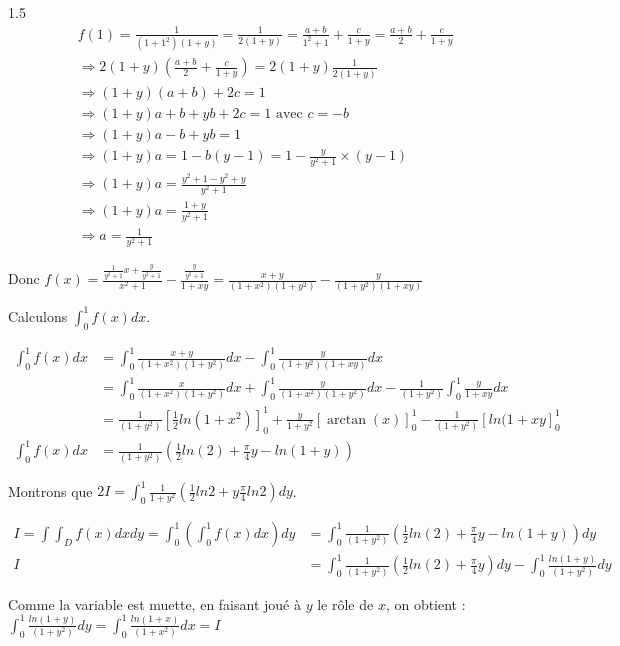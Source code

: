 \documentclass[12pt]{article}
\begin{document}
\begin{spacing}{1.5}
\begin{align*}
&f(1)=\frac{1}{(1+1^2)(1+y)}=\frac{1}{2(1+y)}=\frac{a+b}{1^2+1}+\frac{c}{1+y}=\frac{a+b}{2}+\frac{c}{1+y}\\
&\Rightarrow 2(1+y)(\frac{a+b}{2}+\frac{c}{1+y})=2(1+y)\frac{1}{2(1+y)}\\
&\Rightarrow (1+y)(a+b)+2c=1\\
&\Rightarrow (1+y)a+b+yb+2c=1 \text{ avec } c=-b\\
&\Rightarrow (1+y)a-b+yb=1\\
&\Rightarrow (1+y)a=1-b(y-1)=1-\frac{y}{y^2+1}\times(y-1)\\
&\Rightarrow (1+y)a=\frac{y^2+1-y^2+y}{y^2+1}\\
&\Rightarrow (1+y)a=\frac{1+y}{y^2+1}\\
&\Rightarrow a=\frac{1}{y^2+1}
\end{align*}

Donc $f(x)=\frac{\frac{1}{y^2+1}x+\frac{y}{y^2+1}}{x^2+1}-\frac{\frac{y}{y^2+1}}{1+xy}=\frac{x+y}{(1+x^2)(1+y^2)}-\frac{y}{(1+y^2)(1+xy)}$

Calculons $\int_{0}^{1}f(x)dx$.

\begin{align*}
\int_{0}^{1}f(x)dx &=\int_{0}^{1}\frac{x+y}{(1+x^2)(1+y^2)}dx-\int_{0}^{1}\frac{y}{(1+y^2)(1+xy)}dx\\
&=\int_{0}^{1}\frac{x}{(1+x^2)(1+y^2)}dx+\int_{0}^{1}\frac{y}{(1+x^2)(1+y^2)}dx-\frac{1}{(1+y^2)}\int_{0}^{1}\frac{y}{1+xy}dx\\
&=\frac{1}{(1+y^2)}[\frac{1}{2}ln(1+x^2)]_0^1+\frac{y}{1+y^2}[\arctan(x)]_0^1-\frac{1}{(1+y^2)}[ln(1+xy]_0^1\\
\int_{0}^{1}f(x)dx &=\frac{1}{(1+y^2)}(\frac{1}{2}ln(2)+\frac{\pi}{4}y-ln(1+y))
\end{align*}



Montrons que $2I = \int_{0}^{1}\frac{1}{1+y^2}\left(\frac{1}{2}ln2 + y\frac{\pi}{4}ln2\right)dy$.

\begin{align*}
I=\int\int_Df(x)dxdy=\int_{0}^{1}\left(\int_{0}^{1}f(x)dx\right)dy &=\int_{0}^{1}\frac{1}{(1+y^2)}\left(\frac{1}{2}ln(2)+\frac{\pi}{4}y-ln(1+y)\right)dy\\
I &=\int_{0}^{1}\frac{1}{(1+y^2)}\left(\frac{1}{2}ln(2)+\frac{\pi}{4}y\right)dy-\int_{0}^{1}\frac{ln(1+y)}{(1+y^2)}dy
\end{align*}

Comme la variable est muette, en faisant joué à $y$ le rôle de $x$, on obtient : $\int_{0}^{1}\frac{ln(1+y)}{(1+y^2)}dy=\int_{0}^{1}\frac{ln(1+x)}{(1+x^2)}dx=I$


\end{spacing}
\end{document}
